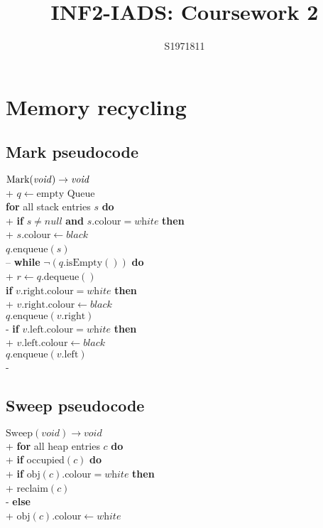 \documentclass{article}
\title{INF2-IADS: Coursework 2}
\author{S1971811}
\begin{document}
\maketitle

\tableofcontents

\section{Memory recycling}

\subsection{Mark pseudocode}

\begin{pseudo}
	$\text{Mark}(\text{\emph{void}}) \to \text{\emph{void}}$\\+
	$q\leftarrow \text{empty Queue}$\\
	\textbf{for} all stack entries $s$ \textbf{do}\\+
	\textbf{if} $s\not=\textit{null}$ \textbf{and} $s.\text{colour} = \textit{white}$ \textbf{then}\\+
	$s.\text{colour} \leftarrow \textit{black}$\\
	$q$.enqueue$(s)$\\--
	\textbf{while} $\neg(q.\text{isEmpty}())$ \textbf{do}\\+
	$r\leftarrow q.\text{dequeue}()$\\
	\textbf{if} $v.\text{right}.\text{colour} = \textit{white}$ \textbf{then}\\+
	$v.\text{right}.\text{colour}\leftarrow\textit{black}$\\
	$q.\text{enqueue}(v.\text{right})$\\-
	\textbf{if} $v.\text{left}.\text{colour} = \textit{white}$ \textbf{then}\\+
	$v.\text{left}.\text{colour}\leftarrow\textit{black}$\\
	$q.\text{enqueue}(v.\text{left})$\\-
\end{pseudo}

\subsection{Sweep pseudocode}

\begin{pseudo}
	$\text{Sweep}(\textit{void})\to\textit{void}$\\+
	\textbf{for} all heap entries $c$ \textbf{do}\\+
	\textbf{if} occupied$(c)$ \textbf{do}\\+
	\textbf{if} $\text{obj}(c).\text{colour} = \textit{white}$ \textbf{then}\\+
	reclaim$(c)$\\-
	\textbf{else}\\+
	$\text{obj}(c).\text{colour}\leftarrow\textit{white}$
\end{pseudo}
\end{document}
